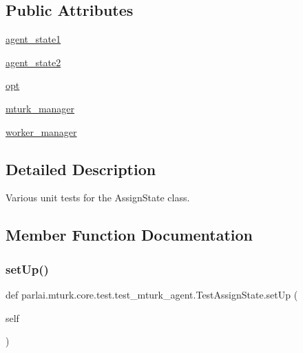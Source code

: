 \subsection*{Public Attributes}
\begin{DoxyCompactItemize}
\item 
\hyperlink{classparlai_1_1mturk_1_1core_1_1test_1_1test__mturk__agent_1_1TestAssignState_a6f2c7861fec97ff6acf347d59e3edd33}{agent\+\_\+state1}
\item 
\hyperlink{classparlai_1_1mturk_1_1core_1_1test_1_1test__mturk__agent_1_1TestAssignState_ad805c50824de8b046ed7383ed7df6a2f}{agent\+\_\+state2}
\item 
\hyperlink{classparlai_1_1mturk_1_1core_1_1test_1_1test__mturk__agent_1_1TestAssignState_a9ae602f4e4cb125db7af899b2f7fbe7c}{opt}
\item 
\hyperlink{classparlai_1_1mturk_1_1core_1_1test_1_1test__mturk__agent_1_1TestAssignState_a1fd58de8c92a9b9bcd6a947e8779394e}{mturk\+\_\+manager}
\item 
\hyperlink{classparlai_1_1mturk_1_1core_1_1test_1_1test__mturk__agent_1_1TestAssignState_abc33da236779de320beefcf72105781f}{worker\+\_\+manager}
\end{DoxyCompactItemize}


\subsection{Detailed Description}
\begin{DoxyVerb}Various unit tests for the AssignState class.
\end{DoxyVerb}
 

\subsection{Member Function Documentation}
\mbox{\label{classparlai_1_1mturk_1_1core_1_1test_1_1test__mturk__agent_1_1TestAssignState_ab007ae6652285eb12ea8868a962e3c24}} 
\subsubsection{\texorpdfstring{set\+Up()}{setUp()}}
{\footnotesize\ttfamily def parlai.\+mturk.\+core.\+test.\+test\+\_\+mturk\+\_\+agent.\+Test\+Assign\+State.\+set\+Up (\begin{DoxyParamCaption}\item[{}]{self }\end{DoxyParamCaption})}

